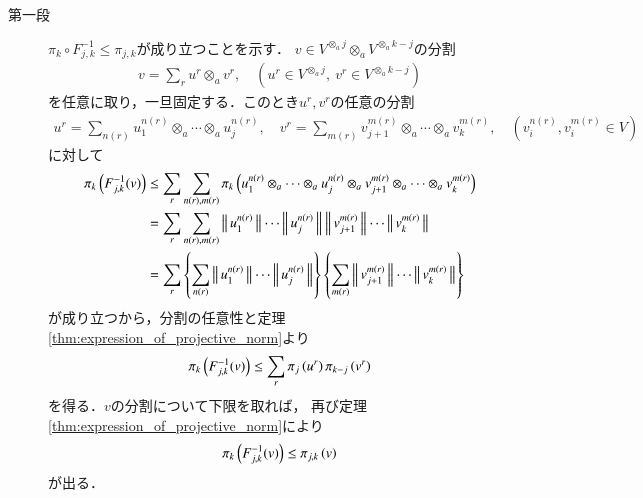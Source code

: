 	\begin{prf}\mbox{}
		\begin{description}
			\item[第一段]
				$\pi_k \circ F^{-1}_{j,k} \leq \pi_{j,k}$が成り立つことを示す．
				$v \in V^{\otimes_a j} \otimes_a V^{\otimes_a k-j}$の分割
				\begin{align}
					v = \sum_{r} u^r \otimes_a v^r,
					\quad (u^r \in V^{\otimes_a j},\ v^r \in V^{\otimes_a k-j})
				\end{align}
				を任意に取り，一旦固定する．このとき$u^r,v^r$の任意の分割
				\begin{align}
					u^r = \sum_{n(r)} u^{n(r)}_1 \otimes_a \cdots \otimes_a u^{n(r)}_j, 
					\quad v^r = \sum_{m(r)} v^{m(r)}_{j+1} \otimes_a \cdots \otimes_a v^{m(r)}_{k},
					\quad (v^{n(r)}_i,v^{m(r)}_i \in V)
				\end{align}
				に対して
				\begin{align}
					\projectivenorm{F^{-1}_{j,k}(v)}{k}
					&\leq \sum_{r} \sum_{n(r),m(r)} \projectivenorm{u^{n(r)}_1 \otimes_a \cdots \otimes_a u^{n(r)}_j \otimes_a v^{m(r)}_{j+1} \otimes_a \cdots \otimes_a v^{m(r)}_{k}}{k} \\
					&= \sum_{r} \sum_{n(r),m(r)} \Norm{u^{n(r)}_1}{} \cdots \Norm{u^{n(r)}_j}{} \Norm{v^{m(r)}_{j+1}}{} \cdots \Norm{v^{m(r)}_k}{} \\
					&= \sum_{r} \left\{ \sum_{n(r)} \Norm{u^{n(r)}_1}{} \cdots \Norm{u^{n(r)}_j}{} \right\} \left\{ \sum_{m(r)} \Norm{v^{m(r)}_{j+1}}{} \cdots \Norm{v^{m(r)}_k}{} \right\} 
				\end{align}
				が成り立つから，分割の任意性と定理\ref{thm:expression_of_projective_norm}より
				\begin{align}
					\projectivenorm{F^{-1}_{j,k}(v)}{k} 
					\leq \sum_r \projectivenorm{u^r}{j}\projectivenorm{v^r}{k-j}
				\end{align}
				を得る．$v$の分割について下限を取れば，
				再び定理\ref{thm:expression_of_projective_norm}により
				\begin{align}
					\projectivenorm{F^{-1}_{j,k}(v)}{k} \leq \projectivenorm{v}{j,k}
				\end{align}
				が出る．
			

\end{description}
\end{prf}
